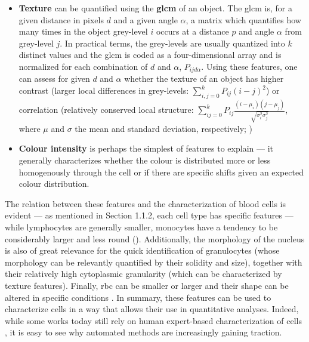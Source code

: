 \begin{itemize}
\begin{itemize}
    \end{itemize}
    \item \textbf{Texture} can be quantified using the \textbf{\ac{glcm}} of an object. The \ac{glcm} is, for a given distance in pixels $d$ and a given angle $\alpha$, a matrix which quantifies how many times in the object grey-level $i$ occurs at a distance $p$ and angle $\alpha$ from grey-level $j$. In practical terms, the grey-levels are usually quantized into $k$ distinct values and the \ac{glcm} is coded as a four-dimensional array and is normalized for each combination of $d$ and $\alpha$,  $P_{ijd\alpha}$. Using these features, one can assess for given $d$ and $\alpha$ whether the texture of an object has higher contrast (larger local differences in grey-levels: $\sum_{i,j=0}^{k}{P_{ij}(i-j)^2}$) or correlation (relatively conserved local structure: $\sum_{ij=0}^{k}P_{ij}\frac{(i-\mu_i)(j-\mu_j)}{\sqrt{\sigma_i^2\sigma_j^2}}$, where $\mu$ and $\sigma$ the mean and standard deviation, respectively; )
    \item \textbf{Colour intensity} is perhaps the simplest of features to explain --- it generally characterizes whether the colour is distributed more or less homogenously through the cell or if there are specific shifts given an expected colour distribution.
\end{itemize}

\begin{figure}[!ht]
	\label{fig:shape-size-examples}
\end{figure}

\begin{figure}[!hb]
	\label{fig:texture-examples}
\end{figure}

The relation between these features and the characterization of blood cells is evident --- as mentioned in Section 1.1.2, each cell type has specific features --- while lymphocytes are generally smaller, monocytes have a tendency to be considerably larger and less round \cite{Bain2005-zg} (). Additionally, the morphology of the nucleus is also of great relevance for the quick identification of granulocytes (whose morphology can be relevantly quantified by their solidity and size), together with their relatively high cytoplasmic granularity (which can be characterized by texture features). Finally, \ac{rbc} can be smaller or larger and their shape can be altered in specific conditions \cite{Aslinia2006-en,Bain2014-oc}. In summary, these features can be used to characterize cells in a way that allows their use in quantitative analyses. Indeed, while some works today still rely on human expert-based characterization of cells \cite{Nagata2020-lh}, it is easy to see why automated methods are increasingly gaining traction.

